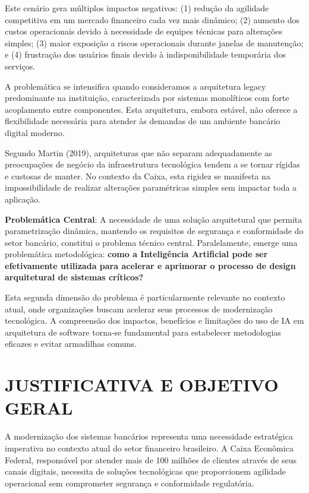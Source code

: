 Este cenário gera múltiplos impactos negativos: (1) redução da agilidade competitiva em um mercado financeiro cada vez mais dinâmico; (2) aumento dos custos operacionais devido à necessidade de equipes técnicas para alterações simples; (3) maior exposição a riscos operacionais durante janelas de manutenção; e (4) frustração dos usuários finais devido à indisponibilidade temporária dos serviços.

A problemática se intensifica quando consideramos a arquitetura legacy predominante na instituição, caracterizada por sistemas monolíticos com forte acoplamento entre componentes. Esta arquitetura, embora estável, não oferece a flexibilidade necessária para atender às demandas de um ambiente bancário digital moderno.

Segundo Martin (2019), arquiteturas que não separam adequadamente as preocupações de negócio da infraestrutura tecnológica tendem a se tornar rígidas e custosas de manter. No contexto da Caixa, esta rigidez se manifesta na impossibilidade de realizar alterações paramétricas simples sem impactar toda a aplicação.

\textbf{Problemática Central}: A necessidade de uma solução arquitetural que permita parametrização dinâmica, mantendo os requisitos de segurança e conformidade do setor bancário, constitui o problema técnico central. Paralelamente, emerge uma problemática metodológica: \textbf{como a Inteligência Artificial pode ser efetivamente utilizada para acelerar e aprimorar o processo de design arquitetural de sistemas críticos?}

Esta segunda dimensão do problema é particularmente relevante no contexto atual, onde organizações buscam acelerar seus processos de modernização tecnológica. A compreensão dos impactos, benefícios e limitações do uso de IA em arquitetura de software torna-se fundamental para estabelecer metodologias eficazes e evitar armadilhas comuns.

\chapter{JUSTIFICATIVA E OBJETIVO GERAL}

A modernização dos sistemas bancários representa uma necessidade estratégica imperativa no contexto atual do setor financeiro brasileiro. A Caixa Econômica Federal, responsável por atender mais de 100 milhões de clientes através de seus canais digitais, necessita de soluções tecnológicas que proporcionem agilidade operacional sem comprometer segurança e conformidade regulatória.


